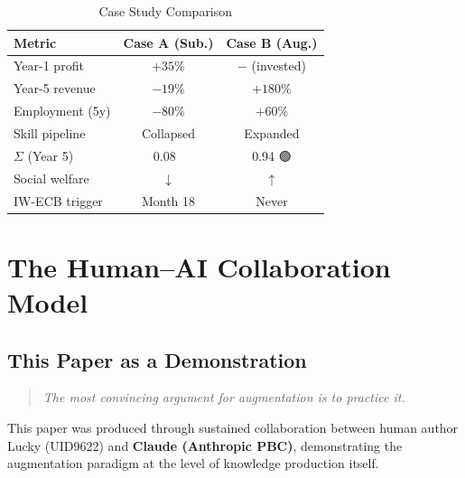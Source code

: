 \documentclass[conference]{IEEEtran}
\begin{document}
\begin{table}[!ht]
\caption{Case Study Comparison}
\label{tab:cases}
\centering
\renewcommand{\arraystretch}{1.2}
\begin{tabular}{lcc}
\toprule
\textbf{Metric}
  & \textbf{Case A (Sub.)}
  & \textbf{Case B (Aug.)} \\
\midrule
Year-1 profit      & $+35\%$      & $-$ (invested) \\
Year-5 revenue     & $-19\%$      & $+180\%$ \\
Employment (5y)    & $-80\%$      & $+60\%$ \\
Skill pipeline     & Collapsed    & Expanded \\
$\Sigma$ (Year 5)  & 0.08 🔴      & 0.94 🟢 \\
Social welfare     & $\downarrow$ & $\uparrow$ \\
IW-ECB trigger     & Month 18     & Never \\
\bottomrule
\end{tabular}
\end{table}

\section{The Human--AI Collaboration Model}

\subsection{This Paper as a Demonstration}

\begin{quote}
\textit{The most convincing argument for augmentation
is to practice it.}
\end{quote}

This paper was produced through sustained collaboration
between human author Lucky (UID9622) and
\textcolor{anthro}{\textbf{Claude (Anthropic PBC)}},
demonstrating the augmentation paradigm at the level
of knowledge production itself.
\end{document}
